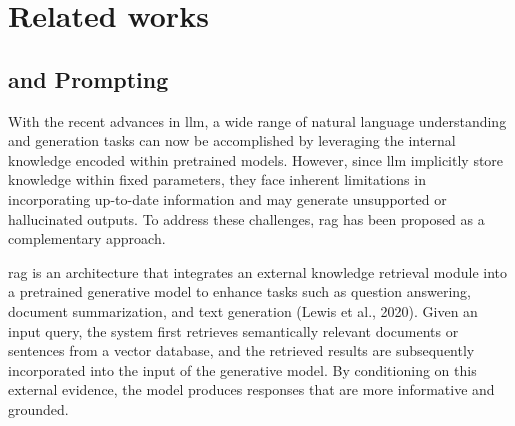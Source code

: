 \documentclass[a4paper,fleqn]{cas-sc}
\begin{document}
\section{Related works}


\subsection{ and Prompting}
With the recent advances in \gls{llm}, a wide range of natural language understanding and generation tasks can now be accomplished by leveraging the internal knowledge encoded within pretrained models. However, since \gls{llm} implicitly store knowledge within fixed parameters, they face inherent limitations in incorporating up-to-date information and may generate unsupported or hallucinated outputs. To address these challenges, \gls{rag} has been proposed as a complementary approach.

\gls{rag} is an architecture that integrates an external knowledge retrieval module into a pretrained generative model to enhance tasks such as question answering, document summarization, and text generation (Lewis et al., 2020). Given an input query, the system first retrieves semantically relevant documents or sentences from a vector database, and the retrieved results are subsequently incorporated into the input of the generative model. By conditioning on this external evidence, the model produces responses that are more informative and grounded.
\end{document}
